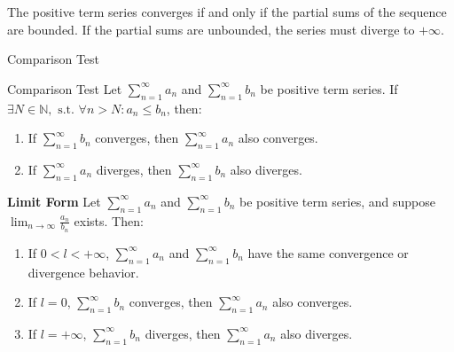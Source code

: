 \documentclass[11pt]{../../TexTemplate/elegantbook}
\begin{document}
\begin{note}
    The positive term series converges if and only if the partial sums of the sequence are bounded. 
    If the partial sums are unbounded, the series must diverge to \( +\infty \).
\end{note}

\begin{leftbarTitle}{Comparison Test}\end{leftbarTitle}
\begin{theorem}{Comparison Test}
    Let \( \sum_{n=1}^{\infty} a_n \) and \( \sum_{n=1}^{\infty} b_n \) be positive term series. 
    If \( \exists N \in \mathbb{N}, \text{ s.t. } \forall n > N: a_n \leqslant b_n \), then:
    \begin{enumerate}
        \item If \( \sum_{n=1}^{\infty} b_n \) converges, then \( \sum_{n=1}^{\infty} a_n \) also converges.
        \item If \( \sum_{n=1}^{\infty} a_n \) diverges, then \( \sum_{n=1}^{\infty} b_n \) also diverges.
    \end{enumerate}

    \textbf{Limit Form}
    Let \( \sum_{n=1}^{\infty} a_n \) and \( \sum_{n=1}^{\infty} b_n \) be positive term series, 
    and suppose \( \lim_{n \to \infty} \frac{a_n}{b_n} \) exists. Then:

    \begin{enumerate}
        \item If \( 0 < l < +\infty \), \( \sum_{n=1}^{\infty} a_n \) and \( \sum_{n=1}^{\infty} b_n \) 
            have the same convergence or divergence behavior.
        \item If \( l = 0 \), \( \sum_{n=1}^{\infty} b_n \) converges, 
            then \( \sum_{n=1}^{\infty} a_n \) also converges.
        \item If \( l = +\infty \), \( \sum_{n=1}^{\infty} b_n \) diverges, 
            then \( \sum_{n=1}^{\infty} a_n \) also diverges.
    \end{enumerate}
\end{theorem}
\end{document}
